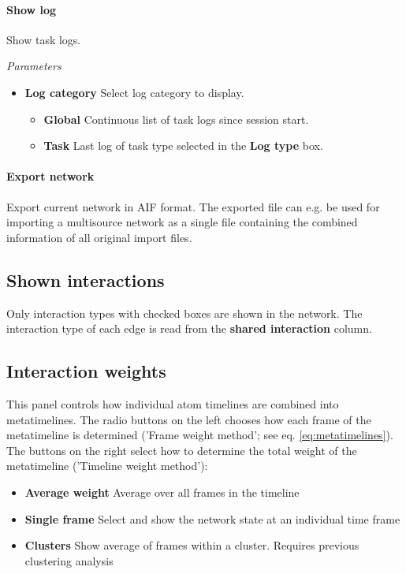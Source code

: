 \paragraph{Show log} Show task logs.
  
\textit{Parameters}
\begin{itemize}
\item \textbf{Log category} Select log category to display.
  \begin{itemize}
    \item \textbf{Global} Continuous list of task logs since session start.
    \item \textbf{Task} Last log of task type selected in the \textbf{Log type} box.
   \end{itemize}
\end{itemize}
  
\paragraph{Export network} Export current network in AIF format. The exported file can e.g. be used for importing a multisource network as a single file containing the combined information of all original import files. 
    
\subsection{Shown interactions}

Only interaction types with checked boxes are shown in the network. The interaction type of each edge is read from the \textbf{shared interaction} column. 

\subsection{Interaction weights}
\label{sec:weight_methods}
This panel controls how individual atom timelines are combined into metatimelines. The radio buttons on the left chooses how each frame of the metatimeline is determined ('Frame weight method'; see eq. \ref{eq:metatimelines}). The buttons on the right select how to determine the total weight of the metatimeline ('Timeline weight method'):

\begin{itemize}
\item \textbf{Average weight} Average over all frames in the timeline
\item \textbf{Single frame} Select and show the network state at an individual time frame
\item \textbf{Clusters} Show average of frames within a cluster. Requires previous clustering analysis
\end{itemize}

